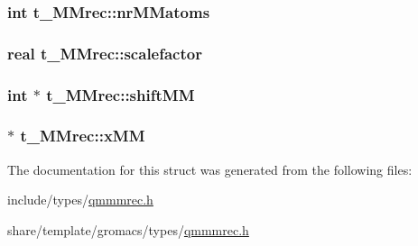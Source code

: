 \hypertarget{structt__MMrec_a3f8160d9fba2bcbedfcfbf7b46c7553d}{
\subsubsection[{nr\-M\-Matoms}]{\setlength{\rightskip}{0pt plus 5cm}int {\bf t\-\_\-\-M\-Mrec\-::nr\-M\-Matoms}}}\label{structt__MMrec_a3f8160d9fba2bcbedfcfbf7b46c7553d}
\hypertarget{structt__MMrec_a318d8786448d57ac9762aab4a3ae27af}{
\subsubsection[{scalefactor}]{\setlength{\rightskip}{0pt plus 5cm}real {\bf t\-\_\-\-M\-Mrec\-::scalefactor}}}\label{structt__MMrec_a318d8786448d57ac9762aab4a3ae27af}
\hypertarget{structt__MMrec_a9e1216571387bb1f3892811612782c8e}{
\subsubsection[{shift\-M\-M}]{\setlength{\rightskip}{0pt plus 5cm}int $\ast$ {\bf t\-\_\-\-M\-Mrec\-::shift\-M\-M}}}\label{structt__MMrec_a9e1216571387bb1f3892811612782c8e}
\hypertarget{structt__MMrec_a50ce80694ff92753ed6a17c0b81502a4}{
\subsubsection[{x\-M\-M}]{ $\ast$ {\bf t\-\_\-\-M\-Mrec\-::x\-M\-M}}}\label{structt__MMrec_a50ce80694ff92753ed6a17c0b81502a4}


\-The documentation for this struct was generated from the following files\-:\begin{DoxyCompactItemize}
\item 
include/types/\hyperlink{include_2types_2qmmmrec_8h}{qmmmrec.\-h}\item 
share/template/gromacs/types/\hyperlink{share_2template_2gromacs_2types_2qmmmrec_8h}{qmmmrec.\-h}\end{DoxyCompactItemize}
